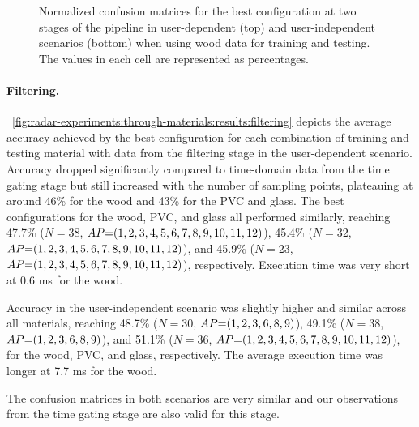 \begin{figure}[!b]
    \vspace{-6pt}
    \caption{Normalized confusion matrices for the best configuration at two stages of the pipeline in user-dependent (top) and user-independent scenarios (bottom) when using wood data for training and testing. The values in each cell are represented as percentages.}
    \label{fig:radar-experiments:through-materials:wood-confusion}
\end{figure}

\paragraph{Filtering.}
\fig~\ref{fig:radar-experiments:through-materials:results:filtering} depicts the average accuracy achieved by the best configuration for each combination of training and testing material with data from the filtering stage in the user-dependent scenario.
%
Accuracy dropped significantly compared to time-domain data from the time gating stage but still increased with the number of sampling points, plateauing at around 46\% for the wood and 43\% for the PVC and glass.
The best configurations for the wood, PVC, and glass all performed similarly, reaching 47.7\% ($N{=}38$, $\splitatcommas{AP{=}(1, 2, 3, 4, 5, 6, 7, 8, 9, 10, 11, 12)}$), 45.4\% ($N{=}32$, $\splitatcommas{AP{=}(1, 2, 3, 4, 5, 6, 7, 8, 9, 10, 11, 12)}$), and 45.9\% ($N{=}23$, $\splitatcommas{AP{=}(1, 2, 3, 4, 5, 6, 7, 8, 9, 10, 11, 12)}$), respectively. Execution time was very short at 0.6 ms for the wood.

Accuracy in the user-independent scenario was slightly higher and similar across all materials, reaching 48.7\% ($N{=}30$, $\splitatcommas{AP{=}(1, 2, 3, 6, 8, 9)}$), 49.1\% ($N{=}38$, $\splitatcommas{AP{=}(1, 2, 3, 6, 8, 9)}$), and 51.1\% ($N{=}36$, $\splitatcommas{AP{=}(1, 2, 3, 4, 5, 6, 7, 8, 9, 10, 11, 12)}$), for the wood, PVC, and glass, respectively. The average execution time was longer at 7.7 ms for the wood.

The confusion matrices in both scenarios are very similar and our observations from the time gating stage are also valid for this stage. 





